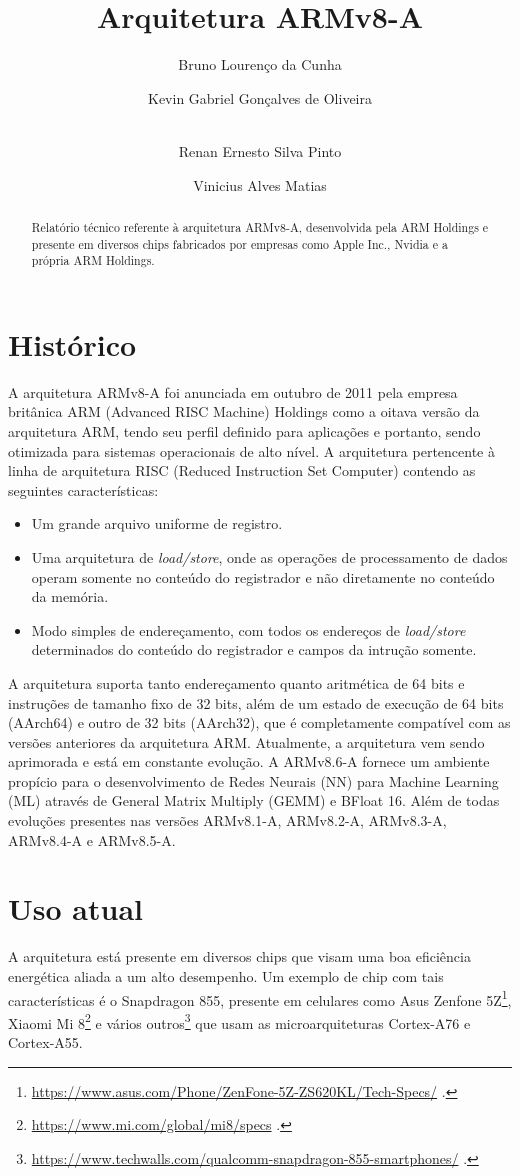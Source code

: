 \documentclass[12pt,a4paper,utf8]{ppgsi}
\title{Arquitetura ARMv8-A}
\author{Bruno Lourenço da Cunha\inst{1}
    \and Kevin Gabriel Gonçalves de Oliveira\inst{2}
    \and \\Renan Ernesto Silva Pinto\inst{3}
    \and Vinicius Alves Matias\inst{4}}
\begin{document}
\maketitle

\begin{abstract} 
    Relatório técnico referente à arquitetura ARMv8-A, desenvolvida pela ARM Holdings e presente em diversos chips fabricados por empresas como Apple Inc., Nvidia e a própria ARM Holdings.
\end{abstract}

\section{Histórico}
    A arquitetura ARMv8-A foi anunciada em outubro de 2011 pela empresa britânica ARM (Advanced RISC Machine) Holdings como a oitava versão da arquitetura ARM, tendo seu perfil definido para aplicações e portanto, sendo otimizada para sistemas operacionais de alto nível. 
    A arquitetura pertencente à linha de arquitetura RISC (Reduced Instruction Set Computer) contendo as seguintes características:
    \begin{itemize}
      \item Um grande arquivo uniforme de registro.
      \item Uma arquitetura de \textit{load/store}, onde as operações de processamento de dados operam somente no conteúdo do registrador e não diretamente no conteúdo da memória.
      \item Modo simples de endereçamento, com todos os endereços de \textit{load/store} determinados do conteúdo do registrador e campos da intrução somente.
    \end{itemize}
    A arquitetura suporta tanto endereçamento quanto aritmética de 64 bits e instruções de tamanho fixo de 32 bits, além de um estado de execução de 64 bits (AArch64) e outro de 32 bits (AArch32), que é completamente compatível com as versões anteriores da arquitetura ARM.
    Atualmente, a arquitetura vem sendo aprimorada e está em constante evolução. A ARMv8.6-A fornece um ambiente propício para o desenvolvimento de Redes Neurais (NN) para Machine Learning (ML) através de General Matrix Multiply (GEMM) e BFloat 16. Além de todas evoluções presentes nas versões ARMv8.1-A, ARMv8.2-A, ARMv8.3-A, ARMv8.4-A e ARMv8.5-A.
    
   
 \section{Uso atual}
 A arquitetura está presente em diversos chips que visam uma boa eficiência energética aliada a um alto desempenho. Um exemplo de chip com tais características é o Snapdragon 855, presente em celulares como Asus Zenfone 5Z\footnote{\url{https://www.asus.com/Phone/ZenFone-5Z-ZS620KL/Tech-Specs/} .}, Xiaomi Mi 8\footnote{\url{https://www.mi.com/global/mi8/specs} .} e vários outros\footnote{\url{https://www.techwalls.com/qualcomm-snapdragon-855-smartphones/} .} que usam as microarquiteturas Cortex-A76 e Cortex-A55.
 
\end{document}
